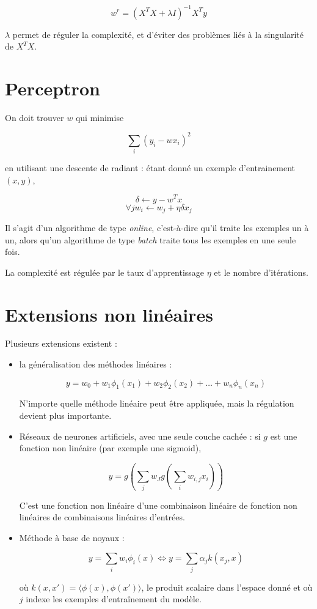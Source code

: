 	$$w^r = (X^T X + \lambda I)^{-1}X^Ty$$
	
	$\lambda$ permet de réguler la complexité, et d'éviter des problèmes liés à la singularité de $X^TX$.
	
	\section{Perceptron}
	
	On doit trouver $w$ qui minimise
	
	$$\sum_i (y_i - wx_i)^2$$
	
	en utilisant une descente de radiant : étant donné un exemple d'entrainement $(x, y)$,
	
	$$\delta \leftarrow y - w^Tx$$
	$$\forall jw_i \leftarrow w_j + \eta \delta x_j$$
	
	Il s'agit d'un algorithme de type \textit{online}, c'est-à-dire qu'il traite les exemples un à un, alors qu'un algorithme de type \textit{batch} traite tous les exemples en une seule fois.
	
	La complexité est régulée par le taux d'apprentissage $\eta$ et le nombre d'itérations.
	
	\section{Extensions non linéaires}
	
	Plusieurs extensions existent :
	
	\begin{itemize}
		\item la généralisation des méthodes linéaires :
		
		$$y = w_0 + w_1 \phi_1(x_1) + w_2 \phi_2(x_2) + \dots + w_n \phi_n(x_n)$$
		
		N'importe quelle méthode linéaire peut être appliquée, mais la régulation devient plus importante.
		
		\item Réseaux de neurones artificiels, avec une seule couche cachée : si $g$ est une fonction non linéaire (par exemple une sigmoid),
		
		$$y = g(\sum_j w_J g(\sum_i w_{i, j} x_i))$$
		
		C'est une fonction non linéaire d'une combinaison linéaire de fonction non linéaires de combinaisons linéaires d'entrées.
		
		\item Méthode à base de noyaux :
		
		$$y = \sum_i w_i \phi_i(x) \Leftrightarrow y = \sum_j \alpha_j k(x_j, x)$$
		
		où $k(x, x') = \langle \phi(x), \phi(x') \rangle$, le produit scalaire dans l'espace donné et où $j$ indexe les exemples d'entraînement du modèle.
	\end{itemize}

